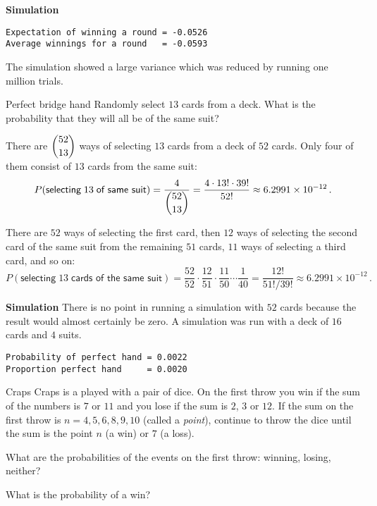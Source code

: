 \textbf{Simulation}
\begin{verbatim}
Expectation of winning a round = -0.0526
Average winnings for a round   = -0.0593
\end{verbatim}
The simulation showed a large variance which was reduced by running one million trials.


\begin{prob}{Perfect bridge hand}
Randomly select $13$ cards from a deck. What is the probability that they will all be of the same suit?
\end{prob}


There are $\displaystyle{52 \choose 13}$ ways of selecting $13$ cards from a deck of $52$ cards. Only four of them consist of $13$ cards from the same suit:
\[
P(\textsf{selecting}\;13\;\textsf{of same suit})=\frac{4}{\displaystyle{52 \choose 13}}=\frac{4\cdot 13!\cdot 39!}{52!}\approx 6.2991\times 10^{-12}\,.
\]


There are $52$ ways of selecting the first card, then $12$ ways of selecting the second card of the same suit from the remaining $51$ cards, $11$ ways of selecting a third card, and so on:
\[
P(\textsf{selecting}\;13\;\textsf{cards of the same suit})=\frac{52}{52}\cdot \frac{12}{51}\cdot \frac{11}{50} \cdots  \frac{1}{40}= \frac{12!}{51!/39!}\approx 6.2991\times 10^{-12}\,.
\]

\textbf{Simulation}
There is no point in running a simulation with $52$ cards because the result would almost certainly be zero. A simulation was run with a deck of $16$ cards and $4$ suits.

\begin{verbatim}
Probability of perfect hand = 0.0022
Proportion perfect hand     = 0.0020
\end{verbatim}


\begin{prob}{Craps}
Craps is a played with a pair of dice. On the first throw you win if the sum of the numbers is $7$ or $11$ and you lose if the sum is $2$, $3$ or $12$. If the sum on the first throw is $n=4,5,6,8,9,10$ (called a \emph{point}), continue to throw the dice until the sum is the point $n$ (a win) or $7$ (a loss).

 What are the probabilities of the events on the first throw: winning, losing, neither?

 What is the probability of a win?
\end{prob}

